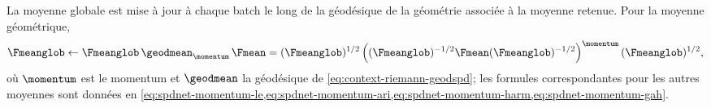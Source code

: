 
\begin{property}
\label{prop:spdnet-momentum}
  La moyenne globale est mise à jour à chaque batch le long de la géodésique de
  la géométrie associée à la moyenne retenue. Pour la moyenne géométrique,
  \begin{equation}
    \Fmeanglob
    \gets
    \Fmeanglob\,\geodmean_{\momentum}\,\Fmean
    =
    (\Fmeanglob)^{1/2}\left((\Fmeanglob)^{-1/2}\Fmean(\Fmeanglob)^{-1/2}\right)^{\momentum}(\Fmeanglob)^{1/2},
    \label{eq:spdnet-momentum-geo}
  \end{equation}
  où $\momentum$ est le momentum et $\geodmean$ la géodésique de
  \cref{eq:context-riemann-geodspd}; les formules correspondantes pour les
  autres moyennes sont données en
  \cref{eq:spdnet-momentum-le,eq:spdnet-momentum-ari,eq:spdnet-momentum-harm,eq:spdnet-momentum-gah}.
\end{property}



